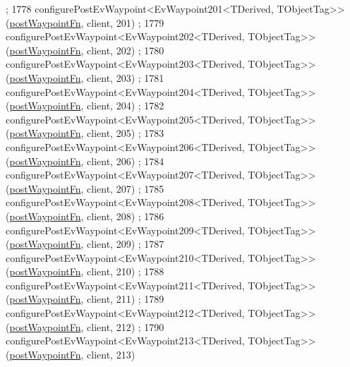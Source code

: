 \begin{DoxyCode}
      ;
1778     configurePostEvWaypoint<EvWaypoint201<TDerived, TObjectTag>>(\hyperlink{classmove__base__z__client_1_1WaypointEventDispatcher_acc538eb7506c13f7cca2268a1742dadd}{postWaypointFn}, client, 201)
      ;
1779     configurePostEvWaypoint<EvWaypoint202<TDerived, TObjectTag>>(\hyperlink{classmove__base__z__client_1_1WaypointEventDispatcher_acc538eb7506c13f7cca2268a1742dadd}{postWaypointFn}, client, 202)
      ;
1780     configurePostEvWaypoint<EvWaypoint203<TDerived, TObjectTag>>(\hyperlink{classmove__base__z__client_1_1WaypointEventDispatcher_acc538eb7506c13f7cca2268a1742dadd}{postWaypointFn}, client, 203)
      ;
1781     configurePostEvWaypoint<EvWaypoint204<TDerived, TObjectTag>>(\hyperlink{classmove__base__z__client_1_1WaypointEventDispatcher_acc538eb7506c13f7cca2268a1742dadd}{postWaypointFn}, client, 204)
      ;
1782     configurePostEvWaypoint<EvWaypoint205<TDerived, TObjectTag>>(\hyperlink{classmove__base__z__client_1_1WaypointEventDispatcher_acc538eb7506c13f7cca2268a1742dadd}{postWaypointFn}, client, 205)
      ;
1783     configurePostEvWaypoint<EvWaypoint206<TDerived, TObjectTag>>(\hyperlink{classmove__base__z__client_1_1WaypointEventDispatcher_acc538eb7506c13f7cca2268a1742dadd}{postWaypointFn}, client, 206)
      ;
1784     configurePostEvWaypoint<EvWaypoint207<TDerived, TObjectTag>>(\hyperlink{classmove__base__z__client_1_1WaypointEventDispatcher_acc538eb7506c13f7cca2268a1742dadd}{postWaypointFn}, client, 207)
      ;
1785     configurePostEvWaypoint<EvWaypoint208<TDerived, TObjectTag>>(\hyperlink{classmove__base__z__client_1_1WaypointEventDispatcher_acc538eb7506c13f7cca2268a1742dadd}{postWaypointFn}, client, 208)
      ;
1786     configurePostEvWaypoint<EvWaypoint209<TDerived, TObjectTag>>(\hyperlink{classmove__base__z__client_1_1WaypointEventDispatcher_acc538eb7506c13f7cca2268a1742dadd}{postWaypointFn}, client, 209)
      ;
1787     configurePostEvWaypoint<EvWaypoint210<TDerived, TObjectTag>>(\hyperlink{classmove__base__z__client_1_1WaypointEventDispatcher_acc538eb7506c13f7cca2268a1742dadd}{postWaypointFn}, client, 210)
      ;
1788     configurePostEvWaypoint<EvWaypoint211<TDerived, TObjectTag>>(\hyperlink{classmove__base__z__client_1_1WaypointEventDispatcher_acc538eb7506c13f7cca2268a1742dadd}{postWaypointFn}, client, 211)
      ;
1789     configurePostEvWaypoint<EvWaypoint212<TDerived, TObjectTag>>(\hyperlink{classmove__base__z__client_1_1WaypointEventDispatcher_acc538eb7506c13f7cca2268a1742dadd}{postWaypointFn}, client, 212)
      ;
1790     configurePostEvWaypoint<EvWaypoint213<TDerived, TObjectTag>>(\hyperlink{classmove__base__z__client_1_1WaypointEventDispatcher_acc538eb7506c13f7cca2268a1742dadd}{postWaypointFn}, client, 213)

\end{DoxyCode}
